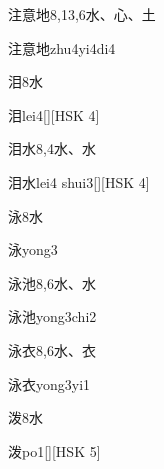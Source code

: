 \begin{Entry}{注意地}{8,13,6}{⽔、⼼、⼟}
  \begin{Phonetics}{注意地}{zhu4yi4di4}
  \end{Phonetics}
\end{Entry}

\begin{Entry}{泪}{8}{⽔}
  \begin{Phonetics}{泪}{lei4}[][HSK 4]
  \end{Phonetics}
\end{Entry}

\begin{Entry}{泪水}{8,4}{⽔、⽔}
  \begin{Phonetics}{泪水}{lei4 shui3}[][HSK 4]
  \end{Phonetics}
\end{Entry}

\begin{Entry}{泳}{8}{⽔}
  \begin{Phonetics}{泳}{yong3}
  \end{Phonetics}
\end{Entry}

\begin{Entry}{泳池}{8,6}{⽔、⽔}
  \begin{Phonetics}{泳池}{yong3chi2}
  \end{Phonetics}
\end{Entry}

\begin{Entry}{泳衣}{8,6}{⽔、⾐}
  \begin{Phonetics}{泳衣}{yong3yi1}
  \end{Phonetics}
\end{Entry}

\begin{Entry}{泼}{8}{⽔}
  \begin{Phonetics}{泼}{po1}[][HSK 5]
  \end{Phonetics}
\end{Entry}

